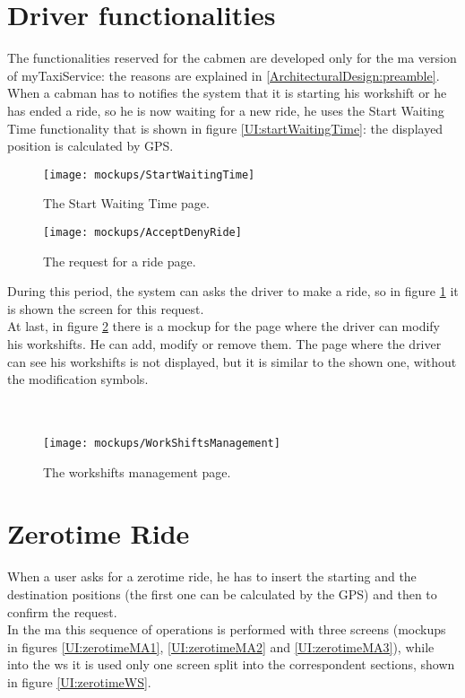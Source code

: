 \documentclass[\mainpath/main]{subfiles}
\begin{document}
\clearpage

\section{Driver functionalities}
The functionalities reserved for the cabmen are developed only for the \gls{ma} version of myTaxiService: the reasons are explained in \autoref{ArchitecturalDesign:preamble}. When a cabman has to notifies the system that it is starting his workshift or he has ended a ride, so he is now waiting for a new ride, he uses the Start Waiting Time functionality that is shown in figure \ref{UI:startWaitingTime}: the displayed position is calculated by GPS.\\

\begin{figure}[ht!]
	\centering
	\begin{minipage}[t]{0.45\textwidth}
		\centering
		\texttt{[image: mockups/StartWaitingTime]}
		\caption{The Start Waiting Time page.}
		\label{UI:startWaitingTime}
	\end{minipage}
	\hspace{0.05 cm}
	\begin{minipage}[t]{0.45\linewidth}
		\centering
		\texttt{[image: mockups/AcceptDenyRide]}
		\caption[The request for a ride to a driver page.]{The request for a ride page.}
		\label{UI:acceptDenyRide}
	\end{minipage}
\end{figure}

During this period, the system can asks the driver to make a ride, so in figure \ref{UI:acceptDenyRide} it is shown the screen for this request.\\
At last, in figure \ref{UI:workshift} there is a mockup for the page where the driver can modify his workshifts. He can add, modify or remove them. The page where the driver can see his workshifts is not displayed, but it is similar to the shown one, without the modification symbols.\\
\\
\\

\begin{figure}[ht!]
	\centering
	\texttt{[image: mockups/WorkShiftsManagement]}
	\caption{The workshifts management page.}
	\label{UI:workshift}
\end{figure}

\section{Zerotime Ride}
When a user asks for a zerotime ride, he has to insert the starting and the destination positions (the first one can be calculated by the GPS) and then to confirm the request.\\
In the \gls{ma} this sequence of operations is performed with three screens (mockups in figures \ref{UI:zerotimeMA1}, \ref{UI:zerotimeMA2} and \ref{UI:zerotimeMA3}), while into the \gls{ws} it is used only one screen split into the correspondent sections, shown in figure \ref{UI:zerotimeWS}.
\end{document}
